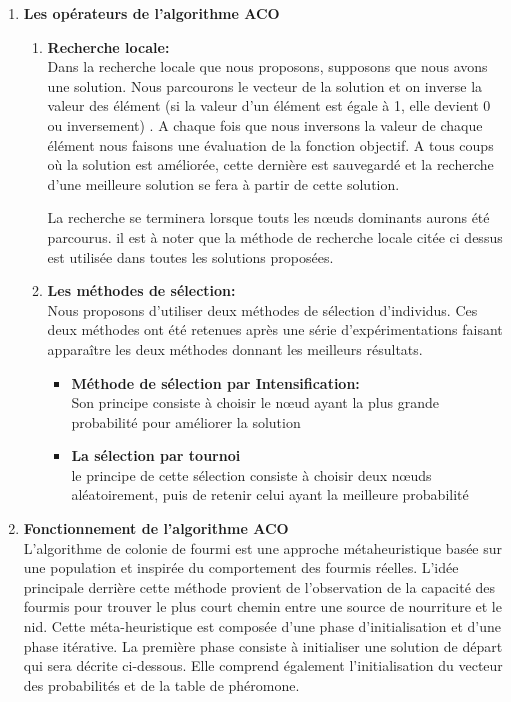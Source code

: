 \begin{enumerate}
	\item \textbf{Les opérateurs de l’algorithme ACO}\\
\begin{enumerate}[label=\alph*)]
	\item \textbf{Recherche locale:}\\
	Dans la recherche locale que nous proposons, supposons que nous avons une solution. Nous parcourons le vecteur de la solution et on inverse la valeur des élément (si la valeur d’un élément est égale à 1, elle devient 0 ou inversement) . A chaque fois que nous inversons  la valeur  de chaque élément nous faisons une évaluation de la fonction objectif. A tous coups où la solution est améliorée, cette dernière est sauvegardé et la recherche d’une meilleure solution se fera à partir de cette solution.
	
La recherche se terminera lorsque touts  les nœuds dominants aurons été parcourus.
il est à noter que la méthode de recherche locale citée ci dessus est utilisée dans toutes les solutions proposées.
	
	\item \textbf{Les méthodes de sélection:}\\
	Nous proposons d'utiliser deux méthodes de sélection d’individus. Ces deux méthodes ont été retenues après une série d'expérimentations faisant apparaître les deux méthodes donnant les meilleurs résultats.

	\begin{itemize}
		\item \textbf{Méthode de sélection par Intensification: }\\
		Son principe consiste à choisir le nœud ayant la plus grande probabilité pour améliorer la solution 
		
		\item \textbf{La sélection par tournoi}\\
		le principe de cette sélection consiste à choisir deux nœuds aléatoirement, puis de retenir celui ayant la meilleure probabilité 
	\end{itemize}
\end{enumerate}
	


	\item \textbf{Fonctionnement de l’algorithme ACO}\\
L’algorithme de colonie de fourmi est une approche métaheuristique basée sur une  population et inspirée du comportement des fourmis réelles. L’idée principale derrière cette méthode provient de l’observation de la capacité des fourmis pour trouver le plus court chemin entre une  source de nourriture et le nid.
Cette méta-heuristique est composée d’une phase d’initialisation et d’une phase itérative. La première phase consiste à initialiser une solution de départ qui sera décrite ci-dessous. Elle comprend également l’initialisation du vecteur des probabilités et de la table de phéromone.


\end{enumerate}
